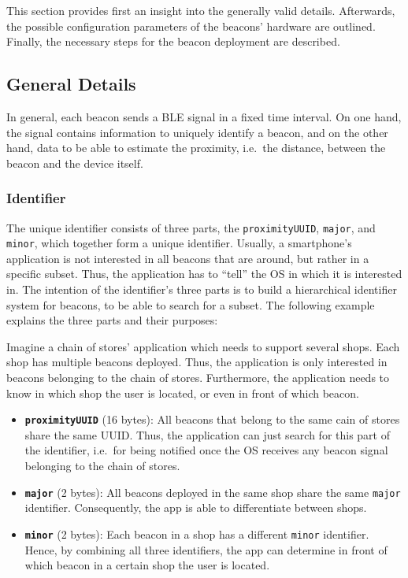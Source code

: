 This section provides first an insight into the generally valid details. Afterwards, the possible configuration parameters of the beacons' hardware are outlined. Finally, the necessary steps for the beacon deployment are described.

\subsection{General Details}
In general, each beacon sends a \acs{BLE} signal in a fixed time interval. On one hand, the signal contains information to uniquely identify a beacon, and on the other hand, data to be able to estimate the proximity, i.e.\ the distance, between the beacon and the device itself.

\subsubsection*{Identifier}
The unique identifier consists of three parts, the \texttt{proximityUUID}, \texttt{major}, and \texttt{minor}, which together form a unique identifier. Usually, a smartphone's application is not interested in all beacons that are around, but rather in a specific subset. Thus, the application has to ``tell'' the \ac{OS} in which it is interested in. The intention of the identifier's three parts is to build a hierarchical identifier system for beacons, to be able to search for a subset. The following example explains the three parts and their purposes:

Imagine a chain of stores' application which needs to support several shops. Each shop has multiple beacons deployed. Thus, the application is only interested in beacons belonging to the chain of stores. Furthermore, the application needs to know in which shop the user is located, or even in front of which beacon.

\begin{itemize}
  \item \textbf{\texttt{proximityUUID}} (16 bytes): All beacons that belong to the same cain of stores share the same \acl{UUID}. Thus, the application can just search for this part of the identifier, i.e.\ for being notified once the \ac{OS} receives any beacon signal belonging to the chain of stores.
  \item \textbf{\texttt{major}} (2 bytes): All beacons deployed in the same shop share the same \texttt{major} identifier. Consequently, the app is able to differentiate between shops.
  \item \textbf{\texttt{minor}} (2 bytes): Each beacon in a shop has a different \texttt{minor} identifier. Hence, by combining all three identifiers, the app can determine in front of which beacon in a certain shop the user is located.
\end{itemize}

